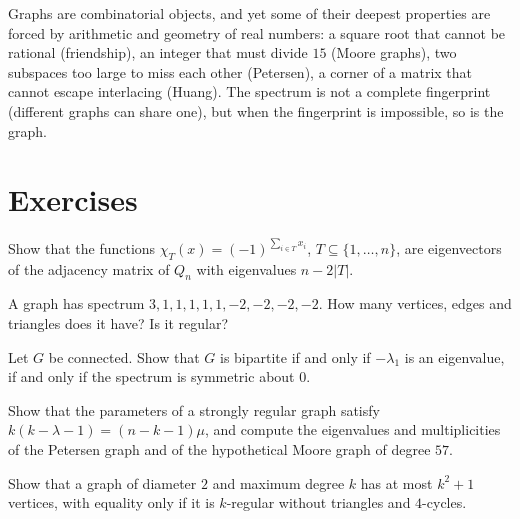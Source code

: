 \begin{beauty}
Graphs are combinatorial objects, and yet some of their deepest properties are forced by arithmetic and geometry of real numbers:
a square root that cannot be rational (friendship), an integer that must divide $15$ (Moore graphs), two subspaces too large to
miss each other (Petersen), a corner of a matrix that cannot escape interlacing (Huang). The spectrum is not a complete
fingerprint (different graphs can share one), but when the fingerprint is impossible, so is the graph.
\end{beauty}

\section{Exercises}

\begin{exercise}[$\star$]\label{linear:ex:hypercube}
Show that the functions $\chi_T(x)=(-1)^{\sum_{i\in T}x_i}$, $T\subseteq\{1,\dots,n\}$, are eigenvectors of the adjacency matrix of
$Q_n$ with eigenvalues $n-2|T|$.
\end{exercise}

\begin{exercise}[$\star$]\label{linear:ex:spectrumcount}
A graph has spectrum $3,1,1,1,1,1,-2,-2,-2,-2$. How many vertices, edges and triangles does it have? Is it regular?
\end{exercise}

\begin{exercise}[$\star\star$]\label{linear:ex:bipartite}
Let $G$ be connected. Show that $G$ is bipartite if and only if $-\lambda_1$ is an eigenvalue, if and only if the spectrum is
symmetric about $0$.
\end{exercise}

\begin{exercise}[$\star$]\label{linear:ex:srgcount}
Show that the parameters of a strongly regular graph satisfy $k(k-\lambda-1)=(n-k-1)\mu$, and compute the eigenvalues and
multiplicities of the Petersen graph and of the hypothetical Moore graph of degree $57$.
\end{exercise}

\begin{exercise}[$\star$]\label{linear:ex:moorebound}
Show that a graph of diameter $2$ and maximum degree $k$ has at most $k^2+1$ vertices, with equality only if it is $k$-regular
without triangles and $4$-cycles.
\end{exercise}


